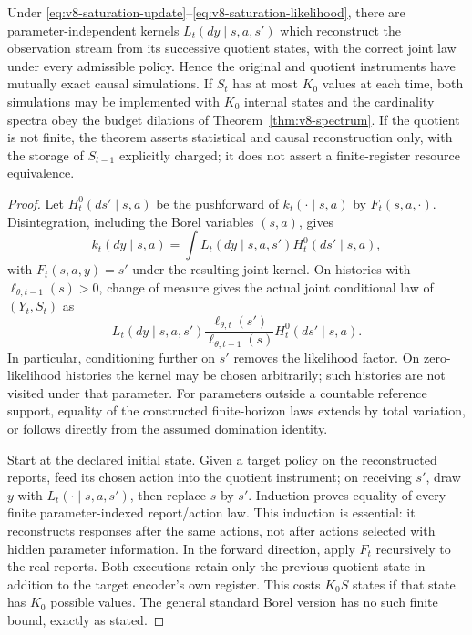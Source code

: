 \begin{theorem}
\label{thm:v8-causal-sufficiency}
Under \eqref{eq:v8-saturation-update}--\eqref{eq:v8-saturation-likelihood},
there are parameter-independent kernels
$L_t(dy\mid s,a,s')$ which reconstruct the observation stream from its
successive quotient states, with the correct joint law under every
admissible policy. Hence the original and quotient instruments have
mutually exact causal simulations. If $S_t$ has at most $K_0$ values
at each time, both simulations may be implemented with $K_0$ internal
states and the cardinality spectra obey the budget dilations of
Theorem~\ref{thm:v8-spectrum}. If the quotient is not finite, the theorem
asserts statistical and causal reconstruction only, with the storage of
$S_{t-1}$ explicitly charged; it does not assert a finite-register
resource equivalence.
\end{theorem}
\begin{proof}
Let $H_t^0(ds'\mid s,a)$ be the pushforward of $k_t(\cdot\mid s,a)$ by
$F_t(s,a,\cdot)$. Disintegration, including the Borel variables $(s,a)$,
gives
\begin{equation}
 k_t(dy\mid s,a)
   =\int L_t(dy\mid s,a,s')H_t^0(ds'\mid s,a),         \label{eq:v8-causaldisintegration}
\end{equation}
with $F_t(s,a,y)=s'$ under the resulting joint kernel. On histories
with $\ell_{\theta,t-1}(s)>0$, change of measure gives the actual joint
conditional law of $(Y_t,S_t)$ as
\[
 L_t(dy\mid s,a,s')
 \frac{\ell_{\theta,t}(s')}{\ell_{\theta,t-1}(s)}
 H_t^0(ds'\mid s,a).
\]
In particular, conditioning further on $s'$ removes the likelihood
factor. On zero-likelihood histories the kernel may be chosen
arbitrarily; such histories are not visited under that parameter.
For parameters outside a countable reference support, equality of the
constructed finite-horizon laws extends by total variation, or follows
directly from the assumed domination identity.

Start at the declared initial state. Given a target policy on the
reconstructed reports, feed its chosen action into the quotient
instrument; on receiving $s'$, draw $y$ with $L_t(\cdot\mid s,a,s')$,
then replace $s$ by $s'$. Induction proves equality of every finite
parameter-indexed report/action law. This induction is essential: it reconstructs
responses after the same actions, not after actions selected with hidden
parameter information. In the forward direction, apply $F_t$ recursively
to the real reports. Both executions retain only the previous quotient
state in addition to the target encoder's own register. This costs
$K_0S$ states if that state has $K_0$ possible values. The general
standard Borel version has no such finite bound, exactly as stated.
\end{proof}

